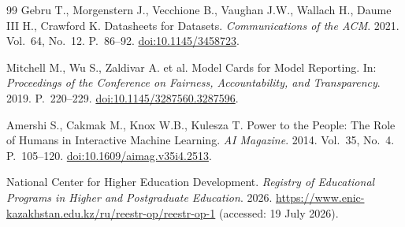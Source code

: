 \documentclass[twoside,11pt]{article}
\begin{document}
\begin{thebibliography}{99}
Gebru T., Morgenstern J., Vecchione B., Vaughan J.W., Wallach H., Daume III H., Crawford K.
Datasheets for Datasets.
\textit{Communications of the ACM}. 2021. Vol.~64, No.~12. P.~86--92.
\href{https://doi.org/10.1145/3458723}{doi:10.1145/3458723}.

Mitchell M., Wu S., Zaldivar A. et al.
Model Cards for Model Reporting.
In: \textit{Proceedings of the Conference on Fairness, Accountability, and Transparency}. 2019. P.~220--229.
\href{https://doi.org/10.1145/3287560.3287596}{doi:10.1145/3287560.3287596}.

Amershi S., Cakmak M., Knox W.B., Kulesza T.
Power to the People: The Role of Humans in Interactive Machine Learning.
\textit{AI Magazine}. 2014. Vol.~35, No.~4. P.~105--120.
\href{https://doi.org/10.1609/aimag.v35i4.2513}{doi:10.1609/aimag.v35i4.2513}.

National Center for Higher Education Development.
\textit{Registry of Educational Programs in Higher and Postgraduate Education}. 2026.
\url{https://www.enic-kazakhstan.edu.kz/ru/reestr-op/reestr-op-1} (accessed: 19 July 2026).

\end{thebibliography}
\end{document}
